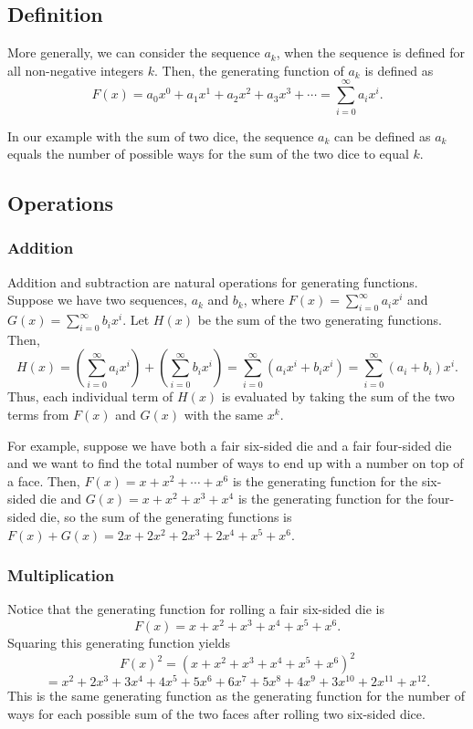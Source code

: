 \documentclass[12pt]{article}
\begin{document}
\subsection{Definition}
More generally, we can consider the sequence $a_k$, when the sequence is defined for all non-negative integers $k$. Then, the generating function of $a_k$ is defined as
\[F(x) = a_0 x^0 + a_1 x^1 + a_2 x^2 + a_3 x^3 + \cdots = \sum_{i=0}^\infty a_i x^i.\]

In our example with the sum of two dice, the sequence $a_k$ can be defined as $a_k$ equals the number of possible ways for the sum of the two dice to equal $k$.
\subsection{Operations}
\subsubsection{Addition}
Addition and subtraction are natural operations for generating functions. Suppose we have two sequences, $a_k$ and $b_k$, where $F(x) = \sum_{i=0}^\infty a_i x^i$ and ${G(x) = \sum_{i=0}^\infty b_i x^i}$. Let $H(x)$ be the sum of the two generating functions. Then,
\[H(x) = \left(\sum_{i=0}^\infty a_i x^i \right)+ \left( \sum_{i=0}^\infty b_i x^i \right) = \sum_{i=0}^\infty (a_i x^i + b_i x^i) = \sum_{i=0}^\infty (a_i + b_i) x^i.\]
Thus, each individual term of $H(x)$ is evaluated by taking the sum of the two terms from $F(x)$ and $G(x)$ with the same $x^k$.

\begin{sloppypar}For example, suppose we have both a fair six-sided die and a fair four-sided die and we want to find the total number of ways to end up with a number on top of a face. Then, ${F(x) = x + x^2 + \cdots + x^6}$ is the generating function for the six-sided die and ${G(x)= x + x^2 + x^3 + x^4}$ is the generating function for the four-sided die, so the sum of the generating functions is ${F(x)+G(x)=2x+2x^2+2x^3+2x^4+x^5+x^6}$.
\end{sloppypar}
\subsubsection{Multiplication}
\label{multiplication}
Notice that the generating function for rolling a fair six-sided die is \[F(x) = x+x^2+x^3+x^4+x^5+x^6.\] Squaring this generating function yields \[F(x)^2 = (x+x^2+x^3+x^4+x^5+x^6)^2\]\[=x^2 + 2x^3 + 3x^4 + 4x^5 + 5x^6 + 6x^7 + 5x^8 + 4x^9 + 3x^{10} + 2x^{11} + x^{12}.\] This is the same generating function as the generating function for the number of ways for each possible sum of the two faces after rolling two six-sided dice.
\end{document}
